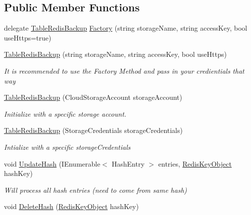 \subsection*{Public Member Functions}
\begin{DoxyCompactItemize}
\item 
delegate \hyperlink{class_demgel_redis_1_1_backing_manager_1_1_table_redis_backup}{Table\+Redis\+Backup} \hyperlink{class_demgel_redis_1_1_backing_manager_1_1_table_redis_backup_ad2cf3786cccf4855c36b0f4b9b6eea99}{Factory} (string storage\+Name, string access\+Key, bool use\+Https=true)
\item 
\hyperlink{class_demgel_redis_1_1_backing_manager_1_1_table_redis_backup_afe95b88cc08f6cd336f8b9befd838487}{Table\+Redis\+Backup} (string storage\+Name, string access\+Key, bool use\+Https)
\begin{DoxyCompactList}\small\item\em It is recommended to use the Factory Method and pass in your credientials that way \end{DoxyCompactList}\item 
\hyperlink{class_demgel_redis_1_1_backing_manager_1_1_table_redis_backup_a3aee678b5c810a63a41d71fadb45cd8c}{Table\+Redis\+Backup} (Cloud\+Storage\+Account storage\+Account)
\begin{DoxyCompactList}\small\item\em Initialize with a specific storage account. \end{DoxyCompactList}\item 
\hyperlink{class_demgel_redis_1_1_backing_manager_1_1_table_redis_backup_a0b4d33dcecd5236a1ebb5089a73d61ac}{Table\+Redis\+Backup} (Storage\+Credentials storage\+Credentials)
\begin{DoxyCompactList}\small\item\em Intialize with a specific storage\+Credentials \end{DoxyCompactList}\item 
void \hyperlink{class_demgel_redis_1_1_backing_manager_1_1_table_redis_backup_a156b585116d9adc63744f4c0f4eaefa6}{Update\+Hash} (I\+Enumerable$<$ Hash\+Entry $>$ entries, \hyperlink{class_demgel_redis_1_1_common_1_1_redis_key_object}{Redis\+Key\+Object} hash\+Key)
\begin{DoxyCompactList}\small\item\em Will process all hash entries (need to come from same hash) \end{DoxyCompactList}\item 
void \hyperlink{class_demgel_redis_1_1_backing_manager_1_1_table_redis_backup_a642f38a893d79849f45f9aa2e6762250}{Delete\+Hash} (\hyperlink{class_demgel_redis_1_1_common_1_1_redis_key_object}{Redis\+Key\+Object} hash\+Key)

\end{DoxyCompactItemize}
